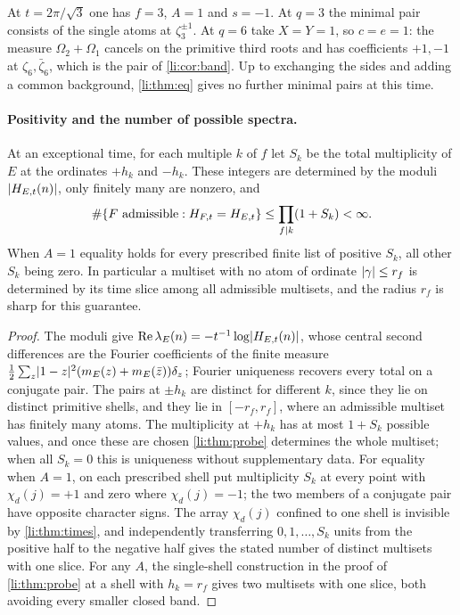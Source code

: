 \begin{example}\label{li:ex:oddcond}
At $t=2\pi/\sqrt3$ one has $f=3$, $A=1$ and $s=-1$. At $q=3$ the minimal pair consists of the single atoms at
$\zeta_3^{\pm1}$. At $q=6$ take $X=Y=1$, so $c=e=1$: the measure $\Omega_2+\Omega_1$ cancels on the primitive third roots and
has coefficients $+1,-1$ at $\zeta_6,\bar\zeta_6$, which is the pair of \cref{li:cor:band}. Up to exchanging the sides and
adding a common background, \cref{li:thm:eq} gives no further minimal pairs at this time.
\end{example}

\paragraph{Positivity and the number of possible spectra.}

\begin{theorem}\label{li:thm:fiber}
At an exceptional time, for each multiple $k$ of $f$ let $S_k$ be the total multiplicity of $E$ at the ordinates
$+h_k$ and $-h_k$. These integers are determined by the moduli $\lvert H_{E,t}(n)\rvert$, only finitely many are nonzero,
and
\[
 \#\{F\text{ admissible}:H_{F,t}=H_{E,t}\}\le\prod_{f\mid k}(1+S_k)<\infty .
\]
When $A=1$ equality holds for every prescribed finite list of positive $S_k$, all other $S_k$ being zero. In
particular a multiset with no atom of ordinate $\lvert\gamma\rvert\le r_f$ is determined by its time slice among all
admissible multisets, and the radius $r_f$ is sharp for this guarantee.
\end{theorem}

\begin{proof}
The moduli give $\operatorname{Re}\lambda_E(n)=-t^{-1}\log\lvert H_{E,t}(n)\rvert$, whose central second differences are the Fourier coefficients
of the finite measure $\frac12\sum_z\lvert1-z\rvert^2(m_E(z)+m_E(\bar z))\delta_z$; Fourier uniqueness recovers every total on a
conjugate pair. The pairs at $\pm h_k$ are distinct for different $k$, since they lie on distinct primitive shells, and
they lie in $[-r_f,r_f]$, where an admissible multiset has finitely many atoms. The multiplicity at $+h_k$ has at most
$1+S_k$ possible values, and once these are chosen \cref{li:thm:probe} determines the whole multiset; when all $S_k=0$
this is uniqueness without supplementary data. For equality when $A=1$, on each prescribed shell put
multiplicity $S_k$ at every point with $\chi_d(j)=+1$ and zero where $\chi_d(j)=-1$; the two members of a conjugate pair have
opposite character signs. The array $\chi_d(j)$ confined to one shell is invisible by \cref{li:thm:times}, and
independently transferring $0,1,\dots,S_k$ units from the positive half to the negative half gives the stated number of
distinct multisets with one slice. For any $A$, the single-shell construction in the proof of \cref{li:thm:probe} at a
shell with $h_k=r_f$ gives two multisets with one slice, both avoiding every smaller closed band.
\end{proof}

